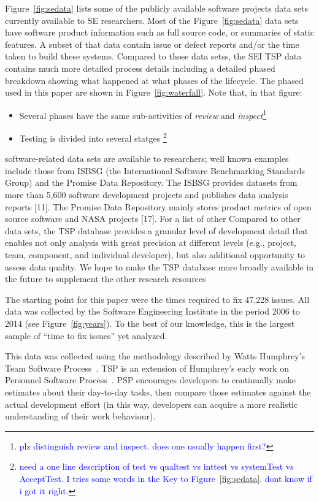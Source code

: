 \documentclass{sig-alternate}
\newcommand{\bill}[1]{\textcolor{blue}{#1}}
\newcommand{\bi}{\begin{itemize}[leftmargin=0.4cm]}
\newcommand{\ei}{\end{itemize}}
\newcommand{\fig}[1]{Figure~\ref{fig:#1}}
\begin{document}
\fig{sedata} lists some of the publicly available
software projects data sets currently available to 
SE researchers. Most of the \fig{sedata} data sets have software product information
such as full source code, or summaries of static features.
A subset of that data contain issue or defect reports and/or
the time taken to build these systems. Compared to those data
setss, the SEI TSP data contains much more detailed process details
including a detailed phased breakdown showing what happened at what
phases of the lifecycle. The phased used in this paper are shown in \fig{waterfall}. Note that, in that figure:
\bi 
\item
Several  phases have the same  sub-activities of {\em review} and {\em inspect}\footnote{\bill{plz distinguish review and inspect. does one usually happen first?}}
\item Testing is divided into several statges \footnote{\bill{need a one
line description of test vs qualtest vs inttest vs systemTest vs AcceptTest. I tries some words in the Key to \fig{sedata}. dont know if i got it right.}}
\ei

software-related data sets are available to researchers; well
known examples include those from ISBSG (the International
Software Benchmarking Standards Group) and the Promise Data
Repository. The ISBSG provides datasets from more than 5,600
software development projects and publishes data analysis reports
[11]. The Promise Data Repository mainly stores product metrics
of open source software and NASA projects [17]. For a  list
of other Compared to
other data sets, the TSP database provides a granular level of
development detail that enables not only analysis with great
precision at different levels (e.g., project, team, component, and
individual developer), but also additional opportunity to assess
data quality. We hope to make the TSP database more broadly
available in the future to supplement the other research resources


The starting point for this paper were the times required to fix 47,228 issues.
All data was collected
by the Software Engineering Institute in the period 2006 to 2014 (see \fig{years}).
To the best of our knowledge, this is the largest sample of ``time to fix issues''
yet analyzed. 

This data was collected using the   methodology described by
Watts Humphrey's Team Software Process~\cite{tsp00}. TSP is an extension of Humphrey's early
work on Personnel Software Process~\cite{psp05}.  PSP encourages developers to continually make estimates
about their day-to-day tasks, then compare those estimates against the actual development effort
(in this way, developers can acquire a more realistic understanding of their work behaviour).
\end{document}
